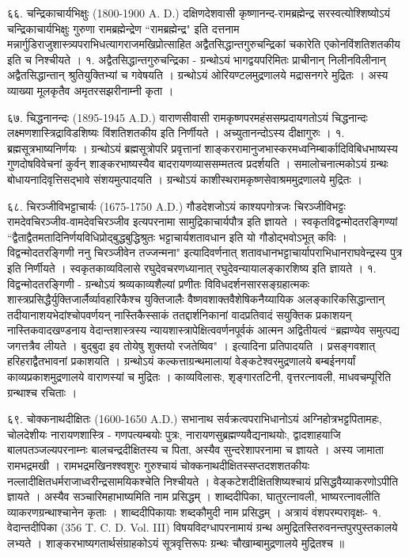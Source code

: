 ६६. चन्द्रिकाचार्यभिक्षुः (1800-1900 A. D.)
दक्षिणदेशवासी कृष्णानन्द-रामब्रह्मेन्द्र सरस्वत्योश्शिष्योऽयं चन्द्रिकाचार्यभिक्षुः गुरुणा रामब्रह्मेन्द्रेण ``रामब्रह्मेन्द्र" इति दत्तनाम मन्नार्गुडिराजुशास्त्र्यपराभिधत्यागराजमखिप्रोत्साहित अद्वैतसिद्धान्तगुरुचन्द्रिकां चकारेति एकोनविंशतिशतकीय इति च निश्चीयते ।
१. अद्वैतसिद्धान्तगुरुचन्द्रिका - 
ग्रन्थोऽयं भागद्वयपरिमितः प्राचीनान् निलीनविलीनान् अद्वैतसिद्धान्तान् श्रुतियुक्तिभ्यां च गवेषयति । ग्रन्थोऽयं ओरियण्टलमुद्रणालये मद्रासनगरे मुद्रितः । अस्य व्याख्या मूलकृतैव अमृतरसझरीनाम्नी कृता ।

६७. चिद्धनानन्दः (1895-1945 A.D.)
वाराणसीवासी रामकृष्णपरमहंससम्प्रदायगतोऽयं चिद्धनान्दः लक्ष्मणशास्त्रिद्राविडशिष्यः विंशतिशतकीय इति निर्णीयते । अच्युतानन्दोऽस्य दीक्षागुरुः ।
१. ब्रह्मसूत्रभाष्यनिर्णयः ।
ग्रन्थोऽयं ब्रह्मसूत्रोपरि प्रवृत्तानां शाङ्कररामानुजभास्करमध्वनिम्बार्कादिविबिधभाष्यस्य गुणदोषविवेचनां कुर्वन् शाङ्करभाष्यस्यैव बादरायणव्याससम्मतत्व प्रदर्शयति । समालोचनात्मकोऽयं ग्रन्थः बोधायनादिवृत्तिसद्भावे संशयमुत्पादयति । ग्रन्थोऽयं काशीस्थरामकृष्णसेवाश्रममुद्रणालये मुद्रितः ।

६८. चिरञ्जीविभट्टाचार्यः (1675-1750 A.D.)
गौडदेशजोऽयं काश्यपगोत्रजः चिरञ्जीविभट्टः रामदेवचिरञ्जीव-वामदेवचिरञ्जीव इत्यपरनामा सामुद्रिकाचार्यपौत्र इति ज्ञायते । स्वकृतविद्वन्मोदतरङ्गिण्यां 
``द्वैताद्वैतमतादिनिर्णयविधिप्रोद्बुद्धबुद्धिश्रुतः
भट्टाचार्यशतावधान इति यो गौडोद्भवोऽभूत् कविः ।
विद्वन्मोदतरङ्गिणी ननु चिरञ्जीवेन तज्जन्मना"
इत्यादिवर्णनात् शतावधानभट्टाचार्यापराभिधानराघवेन्द्रस्य पुत्र इति निर्णीयते । स्वकृतकाव्यविलासे रघुदेवचरणध्यानात् रघुदेवन्यायालङ्कारशिष्य इति ज्ञायते ।
१. विद्वन्मोदतरङ्गिणी - 
ग्रन्थोऽयं श्रव्यकाव्यशैल्यां प्रणीतः विविधदर्शनसारसङ्ग्रहात्मकः शास्त्रप्रसिद्धैर्युक्तिजार्लैर्व्यावहारिकैश्च युक्तिजालैः वैष्णवशाक्तवैशेषिकनैय्यायिक अलङ्कारिकसिद्धान्तान् तदीयानाशयभेदांश्चोपवर्णयन् नास्तिकैस्साकं ततद्दार्शनिकानां वादप्रतिवादं सयुक्तिक प्रकाशयन् नास्तिकवादखण्डनाय वेदान्तशास्त्रस्य न्यायशास्त्रापेक्षित्ववर्णनपूर्वकं आत्मन अद्वितीयत्वं 
``ब्रह्मण्येव समुत्पद्य जगत्तत्रैव लीयते ।
बुद्बुदा इव तोयेषु शुक्तयो रजतेष्विव" ।
इत्यादिना प्रतिपादयति । प्रसङ्गवशात् हरिहराद्वैतभावनां प्रकाशयति । ग्रन्थोऽयं कल्कत्ताग्रन्थमालायां वेङ्कटेश्वरमुद्रणालये बम्बईनगर्यां काव्यप्रकाशमुद्रणालये वाराणस्यां च मुद्रितः ।
काव्यविलासः, शृङ्गारतटिनी, वृत्तरत्नावली, माधवचम्पूरिति ग्रन्थाश्च रचिताः ।

६९. चोक्कनाथदीक्षितः (1600-1650 A.D.)
सभानाथ सर्वक्रत्वपराभिधानोऽयं अग्निहोत्रभट्टपितामहः, चोलदेशीयः नारायणशास्त्रि - गणपत्यम्बयोः पुत्रः, नारायणसुब्रह्मण्यवैद्यनाथयोः, द्वादशाहयाजि बालपतञ्जल्यपरनाम्नः बालचन्द्रदीक्षितस्य च पिता, अस्यैव सुन्दरेशापरनामा च ज्ञायते । अस्य जामाता रामभद्रमखी । रामभद्रमखिनश्श्वशुरः गुरुश्चायं चोक्कनाथदीक्षितस्सप्तदशशतकीयः नल्लादीक्षितधर्मराजाध्वरीन्द्रसामयिकश्चेति निश्चीयते । वेङ्कटेशदीक्षितशिष्यश्चायं प्रसिद्धवैय्याकरणोऽपीति ज्ञायते । अस्यैव सञ्चारिमहाभाष्यमिति नाम प्रसिद्धम् ।
शाब्ददीपिका, घातुरत्नावली, भाष्यरत्नावलीति व्याकरणग्रन्थाश्चानेन कृताः । शाब्ददीपिकायाः शब्दकौमुदी नाम प्रसिद्धम् । अत्रायं वंशपरम्परावृक्षः-
१. वेदान्तदीपिका (356 T. C. D. Vol. III)
विषयविदग्धापरनामायं ग्रन्थ अमुद्रितस्तिरुवनन्तपुरपुस्तकालये लभ्यते । शाङ्करभाष्यगतार्थसंग्राहकोऽयं सूत्रवृत्तिरूपः ग्रन्थः चौखाम्बामुद्रणालये मुद्रितश्च ॥

